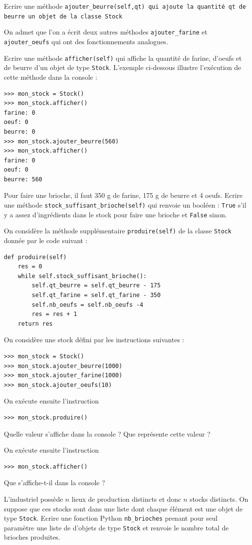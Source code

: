 \documentclass[11pt,a4paper]{article}
\begin{document}
\QListe
\item Ecrire une méthode {\tt ajouter\_beurre(self,qt) qui ajoute la quantité {\tt qt} de beurre  un objet de la classe {\tt Stock}} \\

\parindent -1cm 
\parbox{\textwidth}{On admet que l'on a écrit deux autres méthodes {\tt ajouter\_farine} et {\tt ajouter\_oeufs} qui ont des fonctionnements analogues.} \vspace{0.2cm}


\item Ecrire une méthode {\tt afficher(self)} qui affiche la quantité de farine, d'oeufs et de beurre d'un objet de type {\tt Stock}. L'exemple ci-dessous illustre l'exécution de cette méthode dans la console :
\begin{lstlisting}
>>> mon_stock = Stock()
>>> mon_stock.afficher()
farine: 0
oeuf: 0
beurre: 0
>>> mon_stock.ajouter_beurre(560)
>>> mon_stock.afficher()
farine: 0
oeuf: 0
beurre: 560
\end{lstlisting}

\item Pour faire une brioche, il faut 350 g de farine, 175 g de beurre et 4 oeufs. Ecrire une méthode {\tt stock\_suffisant\_brioche(self)} qui renvoie un booléen : {\tt True} s'il y a assez d'ingrédients dans le stock pour faire une brioche et {\tt False} sinon.
\item On considère la méthode supplémentaire {\tt produire(self)} de la classe {\tt Stock} donnée par le code suivant :
\begin{lstlisting}
def produire(self)
    res = 0
    while self.stock_suffisant_brioche():
        self.qt_beurre = self.qt_beurre - 175
        self.qt_farine = self.qt_farine - 350
        self.nb_oeufs = self.nb_oeufs -4
        res = res + 1
    return res
\end{lstlisting}

On considère une stock défini par les instructions suivantes :
\begin{lstlisting}
>>> mon_stock = Stock()
>>> mon_stock.ajouter_beurre(1000)
>>> mon_stock.ajouter_farine(1000)
>>> mon_stock.ajouter_oeufs(10)
\end{lstlisting}
\SQListe
\item On exécute ensuite l'instruction 
\begin{lstlisting}
>>> mon_stock.produire()
\end{lstlisting}
Quelle valeur s'affiche dans la console ? Que représente cette valeur ?
\item On exécute ensuite l'instruction
\begin{lstlisting}
>>> mon_stock.afficher()
\end{lstlisting}
Que s'affiche-t-il dans la console ?
\FinListe
\item L'industriel possède $n$ lieux de production distincts et donc $n$ stocks distincts. On suppose que ces stocks sont dans une liste dont chaque élément est une objet de type {\tt Stock}. Ecrire une fonction Python {\tt nb\_brioches} prenant pour seul paramètre une liste de d'objets de type {\tt Stock} et renvoie le nombre total de brioches produites.
\FinListe
\end{document}
